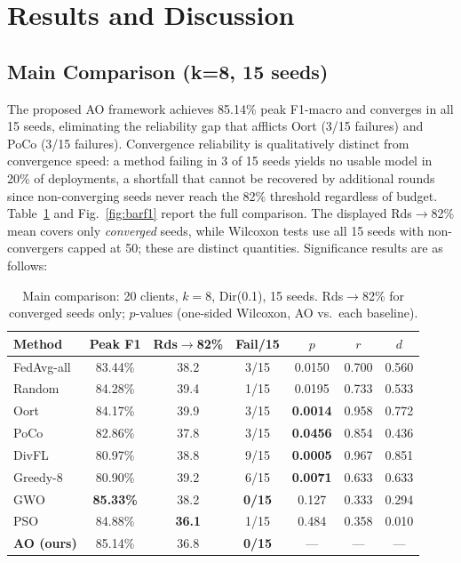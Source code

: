 \documentclass[conference]{IEEEtran}
\begin{document}
\section{Results and Discussion}

\subsection{Main Comparison (k=8, 15 seeds)}
The proposed AO framework achieves 85.14\% peak F1-macro and converges in all 15 seeds, eliminating the reliability gap that afflicts Oort (3/15 failures) and PoCo (3/15 failures). Convergence reliability is qualitatively distinct from convergence speed: a method failing in 3 of 15 seeds yields no usable model in 20\% of deployments, a shortfall that cannot be recovered by additional rounds since non-converging seeds never reach the 82\% threshold regardless of budget. Table~\ref{tab:sota} and Fig.~\ref{fig:barf1} report the full comparison. The displayed Rds$\to$82\% mean covers only \emph{converged} seeds, while Wilcoxon tests use all 15 seeds with non-convergers capped at 50; these are distinct quantities. Significance results are as follows:

\begin{table}[t]
\centering
\caption{Main comparison: 20 clients, $k=8$, Dir(0.1), 15 seeds. Rds$\to$82\% for converged seeds only; $p$-values (one-sided Wilcoxon, AO vs.\ each baseline).}
\label{tab:sota}
\footnotesize
\setlength{\tabcolsep}{3pt}
\begin{tabular}{lcccccc}
\toprule
Method & Peak F1 & Rds$\to$82\% & Fail/15 & $p$ & $r$ & $d$ \\
\midrule
FedAvg-all & 83.44\% & 38.2 & 3/15 & 0.0150 & 0.700 & 0.560 \\
Random & 84.28\% & 39.4 & 1/15 & 0.0195 & 0.733 & 0.533 \\
Oort & 84.17\% & 39.9 & 3/15 & \textbf{0.0014} & 0.958 & 0.772 \\
PoCo & 82.86\% & 37.8 & 3/15 & \textbf{0.0456} & 0.854 & 0.436 \\
DivFL & 80.97\% & 38.8 & 9/15 & \textbf{0.0005} & 0.967 & 0.851 \\
Greedy-8 & 80.90\% & 39.2 & 6/15 & \textbf{0.0071} & 0.633 & 0.633 \\
GWO & \textbf{85.33\%} & 38.2 & \textbf{0/15} & 0.127 & 0.333 & 0.294 \\
PSO & 84.88\% & \textbf{36.1} & 1/15 & 0.484 & 0.358 & 0.010 \\
\textbf{AO (ours)} & 85.14\% & 36.8 & \textbf{0/15} & --- & --- & --- \\
\bottomrule
\end{tabular}
\end{table}
\end{document}
